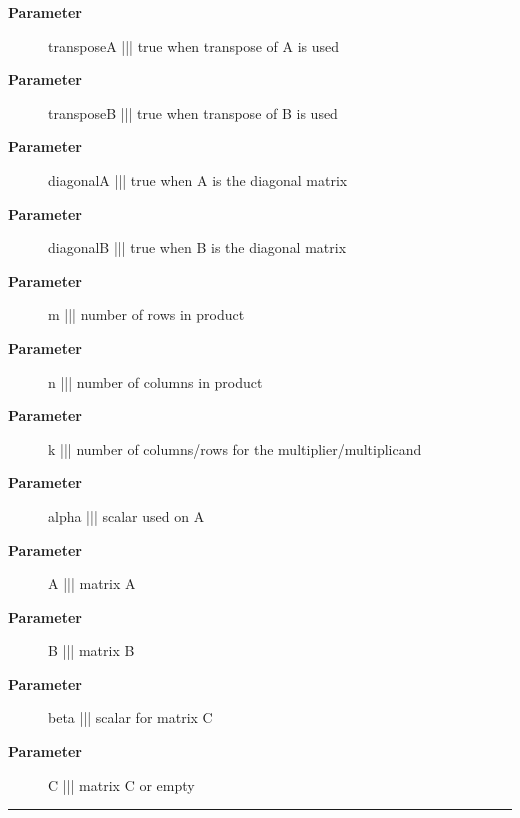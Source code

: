\par
\begin{description}
\item [\textbf{Parameter}] transposeA ||| true when transpose of A is used
\item [\textbf{Parameter}] transposeB ||| true when transpose of B is used
\item [\textbf{Parameter}] diagonalA ||| true when A is the diagonal matrix
\item [\textbf{Parameter}] diagonalB ||| true when B is the diagonal matrix
\item [\textbf{Parameter}] m ||| number of rows in product
\item [\textbf{Parameter}] n ||| number of columns in product
\item [\textbf{Parameter}] k ||| number of columns/rows for the multiplier/multiplicand
\item [\textbf{Parameter}] alpha ||| scalar used on A
\item [\textbf{Parameter}] A ||| matrix A
\item [\textbf{Parameter}] B ||| matrix B
\item [\textbf{Parameter}] beta ||| scalar for matrix C
\item [\textbf{Parameter}] C ||| matrix C or empty
\end{description}

\rule{\textwidth}{0.4pt}
